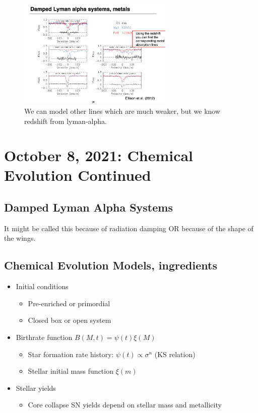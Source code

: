 \documentclass{article}
\begin{document}
\begin{figure}
    \centering
    \includegraphics[width=0.66\textwidth]{figs/Screen Shot 2021-10-06 at 10.59.32 AM.png}
    \caption{We can model other lines which are much weaker, but we know redshift from lyman-alpha.}
    \label{fig:lyman_alpha_systems_metals}
\end{figure}


\section{October 8, 2021: Chemical Evolution Continued}

\subsection{Damped Lyman Alpha Systems}

It might be called this because of radiation damping OR because of the shape of the wings. 

\subsection{Chemical Evolution Models, ingredients}

\begin{itemize}
    \item Initial conditions
    \begin{itemize}
        \item Pre-enriched or primordial
        \item Closed box or open system
    \end{itemize}
    \item Birthrate function $B(M,t) = \psi(t) \xi(M)$
    \begin{itemize}
        \item Star formation rate history: $\psi(t) \propto \sigma^{n}$ (KS relation)
        \item Stellar initial mass function $\xi(m)$
    \end{itemize}
    \item Stellar yields
    \begin{itemize}
        \item Core collapse SN yields depend on stellar mass and metallicity
    \end{itemize}
\end{itemize}
\end{document}
